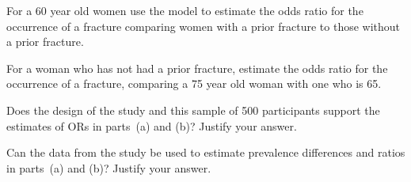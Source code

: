 {\begin{parts}

\item For a 60 year old women use the model to estimate the odds ratio for the occurrence  of a fracture comparing women with a prior fracture to those without a prior fracture.

\item For a woman who has not had a prior fracture, estimate the odds ratio for the occurrence of a fracture, comparing a 75 year old woman with one who is 65.

\item Does the design of the study and this sample of 500 participants support the estimates of ORs in parts~(a) and (b)?  Justify your answer.

\item Can the data from the study be used to estimate prevalence differences and ratios in parts~(a) and (b)? Justify your answer.

\end{parts}

}{}




